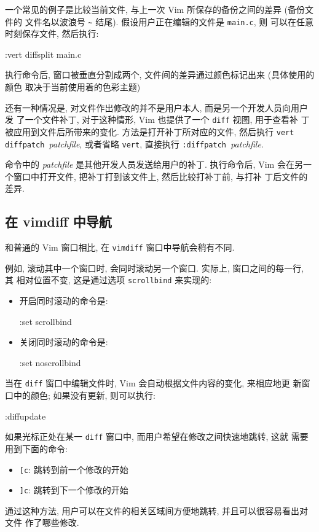 一个常见的例子是比较当前文件, 与上一次 Vim 所保存的备份之间的差异 (备份文件的
文件名以波浪号 \verb'~' 结尾). 假设用户正在编辑的文件是 \texttt{main.c}, 则
可以在任意时刻保存文件, 然后执行:
\begin{vimcode}
:vert diffsplit main.c~
\end{vimcode}
执行命令后, 窗口被垂直分割成两个, 文件间的差异通过颜色标记出来 (具体使用的颜色
取决于当前使用着的色彩主题)

还有一种情况是, 对文件作出修改的并不是用户本人,  而是另一个开发人员向用户发
了一个文件补丁, 对于这种情形, Vim 也提供了一个 \texttt{diff} 视图, 用于查看补
丁被应用到文件后所带来的变化. 方法是打开补丁所对应的文件, 然后执行 \texttt{vert
diffpatch }\textit{patchfile}, 或者省略 \texttt{vert}, 直接执行
\texttt{:diffpatch }\textit{patchfile}.

命令中的 \textit{patchfile} 是其他开发人员发送给用户的补丁. 执行命令后,
Vim 会在另一个窗口中打开文件, 把补丁打到该文件上, 然后比较打补丁前, 与打补
丁后文件的差异.

\subsection{在 vimdiff 中导航}
\label{subsec:navigation_in_vimdiff}

和普通的 Vim 窗口相比, 在 \texttt{vimdiff} 窗口中导航会稍有不同.

例如, 滚动其中一个窗口时, 会同时滚动另一个窗口. 实际上, 窗口之间的每一行, 其
相对位置不变, 这是通过选项 \texttt{scrollbind} 来实现的:
\begin{itemize}
    \item 开启同时滚动的命令是:
        \begin{vimcode}
        :set scrollbind
        \end{vimcode}
    \item 关闭同时滚动的命令是:
        \begin{vimcode}
        :set noscrollbind
        \end{vimcode}
\end{itemize}

当在 \texttt{diff} 窗口中编辑文件时, Vim 会自动根据文件内容的变化, 来相应地更
新窗口中的颜色; 如果没有更新, 则可以执行:
\begin{vimcode}
:diffupdate
\end{vimcode}

如果光标正处在某一 \texttt{diff} 窗口中, 而用户希望在修改之间快速地跳转, 这就
需要用到下面的命令:
\begin{itemize}
    \item \texttt{[c}: 跳转到前一个修改的开始
    \item \texttt{]c}: 跳转到下一个修改的开始
\end{itemize}
通过这种方法, 用户可以在文件的相关区域间方便地跳转, 并且可以很容易看出对文件
作了哪些修改.

